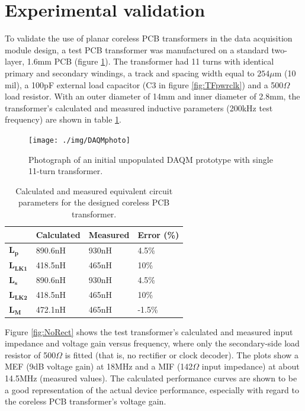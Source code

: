\documentclass[conference]{IEEEtran}
\begin{document}
\section{Experimental validation}
To validate the use of planar coreless PCB transformers in the data acquisition module design, a test PCB transformer was manufactured on a standard two-layer, 1.6mm PCB (figure \ref{fig:DAQMphoto}).  The transformer had 11 turns with identical primary and secondary windings, a track and spacing width equal to $ 254\mu $m (10 mil), a 100pF external load capacitor (C3 in figure \ref{fig:TFpwrclk}) and a 500$\Omega$ load resistor.  With an outer diameter of 14mm and inner diameter of 2.8mm, the transformer's calculated and measured inductive parameters (200kHz test frequency) are shown in table \ref{tab:transformerParameters}.

\begin{figure}[t]
	\centering
	\texttt{[image: ./img/DAQMphoto]}
	\caption{Photograph of an initial unpopulated DAQM prototype with single 11-turn transformer.}
	\label{fig:DAQMphoto}
\end{figure}

\begin{table}[t]
	\centering
	\caption{Calculated and measured equivalent circuit parameters for the designed coreless PCB transformer.}
	\label{tab:transformerParameters}
	\begin{tabular}{l|l|l|l|}
	\cline{2-4}
	              & \textbf{Calculated} & \textbf{Measured} & \textbf{Error (\%)} \\[3pt] \hline 
	\multicolumn{1}{|l|}{$\mathbf{L_{p}}$}   & 890.6nH    & 930nH    & 4.5\%      \\[3pt] \hline 
	\multicolumn{1}{|l|}{$\mathbf{L_{LK1}}$} & 418.5nH    & 465nH    & 10\%       \\[3pt] \hline 
	\multicolumn{1}{|l|}{$\mathbf{L_{s}}$}   & 890.6nH    & 930nH    & 4.5\%      \\[3pt] \hline 
	\multicolumn{1}{|l|}{$\mathbf{L_{LK2}}$} & 418.5nH    & 465nH    & 10\%       \\[3pt] \hline 
	\multicolumn{1}{|l|}{$\mathbf{L_{M}}$}   & 472.1nH    & 465nH    & -1.5\%     \\[3pt] \hline
	\end{tabular}
\end{table}

Figure \ref{fig:NoRect} shows the test transformer's calculated and measured input impedance and voltage gain versus frequency, where only the secondary-side load resistor of 500$\Omega$ is fitted (that is, no rectifier or clock decoder).  The plots show a MEF (9dB voltage gain) at 18MHz and a MIF (142$\Omega$ input impedance) at about 14.5MHz (measured values).  The calculated performance curves are shown to be a good representation of the actual device performance, especially with regard to the coreless PCB transformer's voltage gain.
\end{document}
